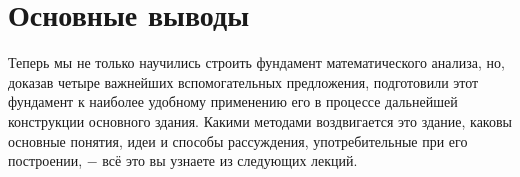 \documentclass{article}
\begin{document}
\section{Основные выводы}

Теперь мы не только научились строить фундамент математического анализа, но, доказав четыре важнейших вспомогательных предложения, подготовили этот фундамент к наиболее удобному применению его в процессе дальнейшей конструкции основного здания. Какими методами воздвигается это здание, каковы основные понятия, идеи и способы рассуждения, употребительные при его построении, \(-\) всё это вы узнаете из следующих лекций.
\end{document}

